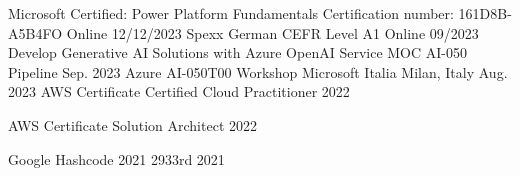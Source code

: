 
\begin{cvhonors}

\cvhonor
{Microsoft Certified: Power Platform Fundamentals} %
{Certification number: 161D8B-A5B4FO} %
{Online} %
{12/12/2023} %
\cvhonor
{Spexx German CEFR Level A1} %
{} %
{Online} %
{09/2023} %
  \cvhonor
    {Develop Generative AI Solutions with Azure OpenAI Service MOC AI-050} %
    {Pipeline} %
    {} %
    {Sep. 2023} %
  \cvhonor
    {Azure AI-050T00} %
    {Workshop Microsoft Italia} %
    {Milan, Italy} %
    {Aug. 2023} %
  \cvhonor
    {AWS Certificate} %
    {Certified Cloud Practitioner} %
    {} %
    {2022} %

  \cvhonor
    {AWS Certificate} %
    {Solution Architect} %
    {} %
    {2022} %

  \cvhonor
    {Google Hashcode 2021} %
    {2933rd} %
    {} %
    {2021} %


\end{cvhonors}


